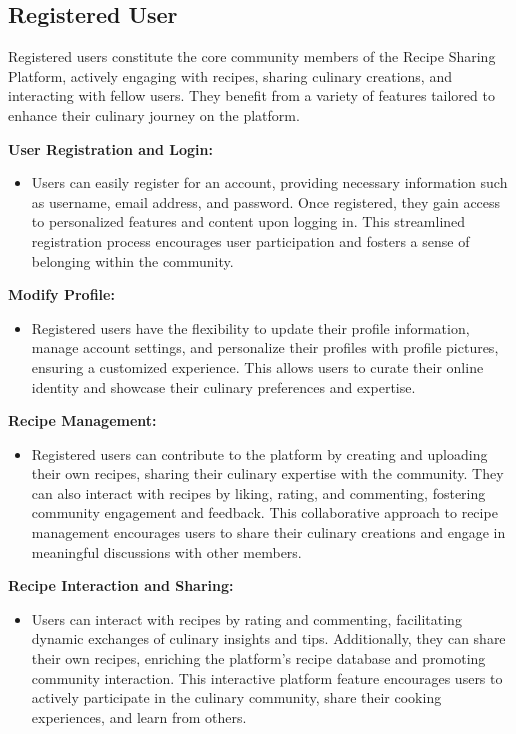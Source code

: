 \subsection{Registered User}
Registered users constitute the core community members of the Recipe Sharing Platform, actively engaging with recipes, sharing culinary creations, and interacting with fellow users. They benefit from a variety of features tailored to enhance their culinary journey on the platform. 

\textbf{User Registration and Login:}
\begin{itemize}
  \item Users can easily register for an account, providing necessary information such as username, email address, and password. Once registered, they gain access to personalized features and content upon logging in. This streamlined registration process encourages user participation and fosters a sense of belonging within the community.
\end{itemize}

\textbf{Modify Profile:}
\begin{itemize}
  \item Registered users have the flexibility to update their profile information, manage account settings, and personalize their profiles with profile pictures, ensuring a customized experience. This allows users to curate their online identity and showcase their culinary preferences and expertise.
\end{itemize}

\textbf{Recipe Management:}
\begin{itemize}
  \item Registered users can contribute to the platform by creating and uploading their own recipes, sharing their culinary expertise with the community. They can also interact with recipes by liking, rating, and commenting, fostering community engagement and feedback. This collaborative approach to recipe management encourages users to share their culinary creations and engage in meaningful discussions with other members.
\end{itemize}

\textbf{Recipe Interaction and Sharing:}
\begin{itemize}
  \item Users can interact with recipes by rating and commenting, facilitating dynamic exchanges of culinary insights and tips. Additionally, they can share their own recipes, enriching the platform's recipe database and promoting community interaction. This interactive platform feature encourages users to actively participate in the culinary community, share their cooking experiences, and learn from others.
\end{itemize}

